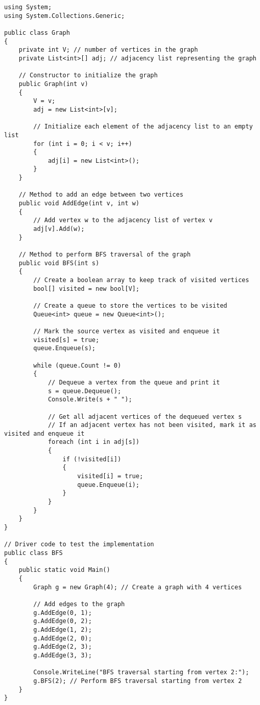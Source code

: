 \documentclass[12pt, titlepage, a4paper]{article}
\begin{document}
\begin{lstlisting}
using System;
using System.Collections.Generic;

public class Graph
{
    private int V; // number of vertices in the graph
    private List<int>[] adj; // adjacency list representing the graph

    // Constructor to initialize the graph
    public Graph(int v)
    {
        V = v;
        adj = new List<int>[v];

        // Initialize each element of the adjacency list to an empty list
        for (int i = 0; i < v; i++)
        {
            adj[i] = new List<int>();
        }
    }

    // Method to add an edge between two vertices
    public void AddEdge(int v, int w)
    {
        // Add vertex w to the adjacency list of vertex v
        adj[v].Add(w);
    }

    // Method to perform BFS traversal of the graph
    public void BFS(int s)
    {
        // Create a boolean array to keep track of visited vertices
        bool[] visited = new bool[V];

        // Create a queue to store the vertices to be visited
        Queue<int> queue = new Queue<int>();

        // Mark the source vertex as visited and enqueue it
        visited[s] = true;
        queue.Enqueue(s);

        while (queue.Count != 0)
        {
            // Dequeue a vertex from the queue and print it
            s = queue.Dequeue();
            Console.Write(s + " ");

            // Get all adjacent vertices of the dequeued vertex s
            // If an adjacent vertex has not been visited, mark it as visited and enqueue it
            foreach (int i in adj[s])
            {
                if (!visited[i])
                {
                    visited[i] = true;
                    queue.Enqueue(i);
                }
            }
        }
    }
}

// Driver code to test the implementation
public class BFS
{
    public static void Main()
    {
        Graph g = new Graph(4); // Create a graph with 4 vertices

        // Add edges to the graph
        g.AddEdge(0, 1);
        g.AddEdge(0, 2);
        g.AddEdge(1, 2);
        g.AddEdge(2, 0);
        g.AddEdge(2, 3);
        g.AddEdge(3, 3);

        Console.WriteLine("BFS traversal starting from vertex 2:");
        g.BFS(2); // Perform BFS traversal starting from vertex 2
    }
}
\end{lstlisting}
\clearpage
\end{document}
